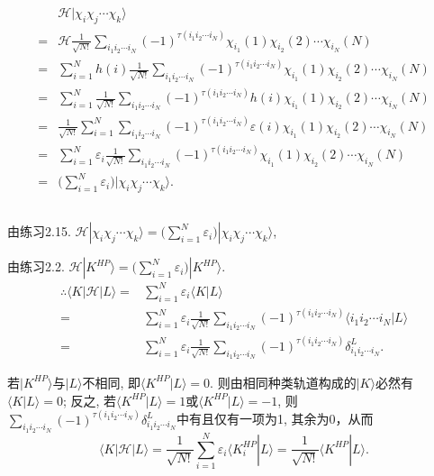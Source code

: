 \documentclass[UTF8]{ctexart}
\newcommand\lrs[3]{\langle#1|#2|#3\rangle}
\begin{document}
	\subsection{}
		\[
		\begin{aligned}
			&\mathscr{H}|\chi_i \chi_j \cdots \chi_k\rangle \\
			=& \mathscr{H}\frac{1}{\sqrt{N!}} \sum_{i_1i_2 \cdots i_N} (-1)^{\tau(i_1i_2 \cdots i_N)} \chi_{i_1}(1) \chi_{i_2}(2) \cdots \chi_{i_N}(N) \\
			=& \sum_{i=1}^N h(i) \frac{1}{\sqrt{N!}} \sum_{i_1i_2 \cdots i_N} (-1)^{\tau(i_1i_2 \cdots i_N)} \chi_{i_1}(1) \chi_{i_2}(2) \cdots \chi_{i_N}(N) \\
			=& \sum_{i=1}^N \frac{1}{\sqrt{N!}} \sum_{i_1i_2 \cdots i_N} (-1)^{\tau(i_1i_2 \cdots i_N)} h(i) \chi_{i_1}(1) \chi_{i_2}(2) \cdots \chi_{i_N}(N) \\
			=& \frac{1}{\sqrt{N!}} \sum_{i=1}^N \sum_{i_1i_2 \cdots i_N} (-1)^{\tau(i_1i_2 \cdots i_N)} \varepsilon(i) \chi_{i_1}(1) \chi_{i_2}(2) \cdots \chi_{i_N}(N) \\
			=& \sum_{i=1}^N \varepsilon_i \frac{1}{\sqrt{N!}} \sum_{i_1i_2 \cdots i_N} (-1)^{\tau(i_1i_2 \cdots i_N)} \chi_{i_1}(1) \chi_{i_2}(2) \cdots \chi_{i_N}(N) \\
			=& \Big( \sum_{i=1}^N \varepsilon_i \Big) | \chi_i \chi_j \cdots \chi_k \rangle .
		\end{aligned}
		\]
	
	\subsection{}
		由练习2.15. $ \mathscr{H}|\chi_i\chi_j \cdots \chi_k \rangle = \Big( \sum_{i=1}^N \varepsilon_i \Big) | \chi_i \chi_j \cdots \chi_k \rangle $, 
		
		由练习2.2. $ \mathscr{H} |K^{HP}\rangle = \Big( \sum_{i=1}^N \varepsilon_i \Big) |K^{HP}\rangle $.
		\[
		\begin{aligned}
			\therefore \langle K | \mathscr{H} | L \rangle =& \sum_{i=1}^N \varepsilon_i \langle K | L \rangle \\
			=& \sum_{i=1}^N \varepsilon_i \frac{1}{\sqrt{N!}} \sum_{i_1i_2\cdots i_N} (-1)^{\tau(i_1i_2\cdots i_N)}\langle i_1i_2\cdots i_N | L \rangle \\
			=& \sum_{i=1}^N \varepsilon_i \frac{1}{\sqrt{N!}} \sum_{i_1i_2\cdots i_N} (-1)^{\tau(i_1i_2\cdots i_N)} \delta_{i_1i_2\cdots i_N}^L.
		\end{aligned}
		\]
		
		若$|K^{HP}\rangle$与$|L\rangle$不相同, 即$\langle K^{HP} | L \rangle = 0$. 则由相同种类轨道构成的$|K\rangle$必然有$\langle K|L\rangle = 0$; 反之, 若$\langle K^{HP}|L\rangle = 1$或$\langle K^{HP}|L\rangle = -1$, 则$ \sum_{i_1i_2\cdots i_N} (-1)^{\tau(i_1i_2\cdots i_N)}\delta_{i_1i_2\cdots i_N}^L $中有且仅有一项为1, 其余为0，从而
		\[
			\lrs{K}{\mathscr{H}}{L} = \frac{1}{\sqrt{N!}} \sum_{i=1}^N \varepsilon_i \langle K_{i}^{HP} | L \rangle = \frac{1}{\sqrt{N!}} \langle K^{HP} | L \rangle.
		\]
		
\end{document}
